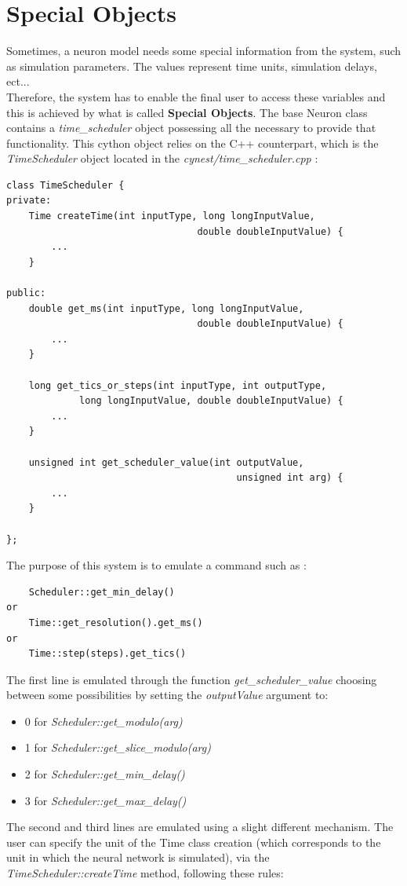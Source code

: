 \documentclass{article}
\begin{document}
\section{Special Objects}
Sometimes, a neuron model needs some special information from the system, such as simulation parameters. The values represent time units, simulation delays, ect...\\
Therefore, the system has to enable the final user to access these variables and this is achieved by what is called \textbf{Special Objects}. The base Neuron class contains a \emph{time\_scheduler} object possessing all the necessary to provide that functionality. This cython object relies on the C++ counterpart, which is the \emph{TimeScheduler} object located in the \emph{cynest/time\_scheduler.cpp} :
\begin{verbatim}
class TimeScheduler {
private:
    Time createTime(int inputType, long longInputValue, 
                                  double doubleInputValue) {
        ...
    }

public:
    double get_ms(int inputType, long longInputValue, 
                                  double doubleInputValue) {
        ...
    }

    long get_tics_or_steps(int inputType, int outputType, 
             long longInputValue, double doubleInputValue) {
        ...
    }

    unsigned int get_scheduler_value(int outputValue, 
                                         unsigned int arg) {
        ...
    }

};
\end{verbatim}
The purpose of this system is to emulate a command such as :
\begin{verbatim}
    Scheduler::get_min_delay()
or
    Time::get_resolution().get_ms()
or
    Time::step(steps).get_tics()
\end{verbatim}
The first line is emulated through the function \emph{get\_scheduler\_value} choosing between some possibilities by setting the \emph{outputValue} argument to:
\begin{itemize}
\item 0 for \emph{Scheduler::get\_modulo(arg)}
\item 1 for \emph{Scheduler::get\_slice\_modulo(arg)}
\item 2 for \emph{Scheduler::get\_min\_delay()}
\item 3 for \emph{Scheduler::get\_max\_delay()}
\end{itemize}
The second and third lines are emulated using a slight different mechanism. The user can specify the unit of the Time class creation (which corresponds to the unit in which the neural network is simulated), via the \emph{TimeScheduler::createTime} method, following these rules:
\end{document}
